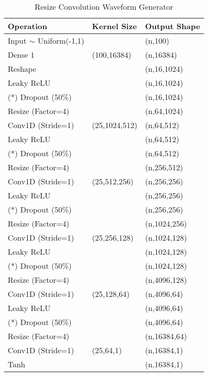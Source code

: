 \begin{table}
\caption{Resize Convolution Waveform Generator}\label{wavegan_gen_resize}
\centering
\begin{tabular}{l|l|l}
Operation & Kernel Size & Output Shape \\ \hline
Input $\sim$ Uniform(-1,1) & \  & (n,100)\\
Dense 1 & (100,16384) & (n,16384)\\
Reshape & \ & (n,16,1024)\\
Leaky ReLU & \ & (n,16,1024)\\
(*) Dropout (50\%) & \ & (n,16,1024)\\
Resize (Factor=4) & \ & (n,64,1024)\\
Conv1D (Stride=1) & (25,1024,512) & (n,64,512)\\
Leaky ReLU & \  & (n,64,512)\\
(*) Dropout (50\%) & \  & (n,64,512)\\
Resize (Factor=4) & \ & (n,256,512)\\
Conv1D (Stride=1) & (25,512,256) & (n,256,256)\\
Leaky ReLU & \  & (n,256,256)\\
(*) Dropout (50\%) & \  & (n,256,256)\\
Resize (Factor=4) & \ & (n,1024,256)\\
Conv1D (Stride=1) & (25,256,128) & (n,1024,128)\\
Leaky ReLU & \  & (n,1024,128)\\
(*) Dropout (50\%) & \  & (n,1024,128)\\
Resize (Factor=4) & \ & (n,4096,128)\\
Conv1D (Stride=1) & (25,128,64) & (n,4096,64)\\
Leaky ReLU & \  & (n,4096,64)\\
(*) Dropout (50\%) & \  & (n,4096,64)\\
Resize (Factor=4) & \ & (n,16384,64)\\
Conv1D (Stride=1) & (25,64,1) & (n,16384,1)\\
Tanh & \  & (n,16384,1)\\
\end{tabular}
\end{table}


